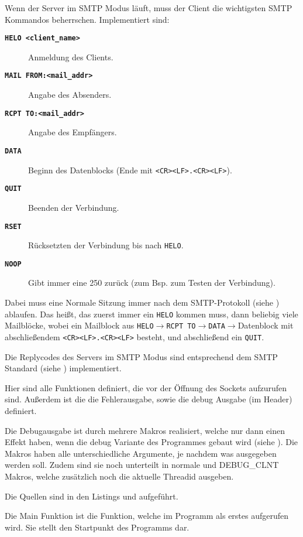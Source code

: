 Wenn der Server im SMTP Modus l\"{a}uft, muss der Client die wichtigsten SMTP Kommandos beherrschen. Implementiert sind:
\begin{description}
  \item[\texttt\bf{HELO <client\_name>}] Anmeldung des Clients.
  \item[\texttt\bf{MAIL FROM:<mail\_addr>}] Angabe des Absenders.
  \item[\texttt\bf{RCPT TO:<mail\_addr>}] Angabe des Empf\"{a}ngers.
  \item[\texttt\bf{DATA}] Beginn des Datenblocks (Ende mit \texttt{<CR><LF>.<CR><LF>}).
  \item[\texttt\bf{QUIT}] Beenden der Verbindung.
  \item[\texttt\bf{RSET}] R\"{u}cksetzten der Verbindung bis nach \texttt{HELO}. 
  \item[\texttt\bf{NOOP}] Gibt immer eine 250 zur\"{u}ck (zum Bsp. zum Testen der Verbindung).
\end{description}

Dabei muss eine Normale Sitzung immer nach dem SMTP-Protokoll (siehe ) ablaufen. Das heißt, das zuerst immer ein \texttt{HELO} kommen muss, dann beliebig viele Mailbl\"{o}cke, wobei ein Mailblock aus \texttt{HELO}$\rightarrow$\texttt{RCPT TO}$\rightarrow$\texttt{DATA}$\rightarrow$Datenblock mit abschließendem \texttt{<CR><LF>.<CR><LF>} besteht, und abschließend ein \texttt{QUIT}.

Die Replycodes des Servers im SMTP Modus sind entsprechend dem SMTP Standard (siehe ) implementiert.

\label{mod:smtprelay}
Hier sind alle Funktionen definiert, die vor der \"{O}ffnung des Sockets aufzurufen sind. Außerdem ist die die Fehlerausgabe, sowie die debug Ausgabe (im Header) definiert. 

Die Debugausgabe ist durch mehrere Makros realisiert, welche nur dann einen Effekt haben, wenn die debug Variante des Programmes gebaut wird (siehe ). Die Makros haben alle unterschiedliche Argumente, je nachdem was ausgegeben werden soll. Zudem sind sie noch unterteilt in normale und DEBUG\_CLNT Makros, welche zus\"{a}tzlich noch die aktuelle Threadid ausgeben.

Die Quellen sind in den Listings  und  aufgef\"{u}hrt.

\label{fn:main}
Die Main Funktion ist die Funktion, welche im Programm als erstes aufgerufen wird. Sie stellt den Startpunkt des Programms dar.

